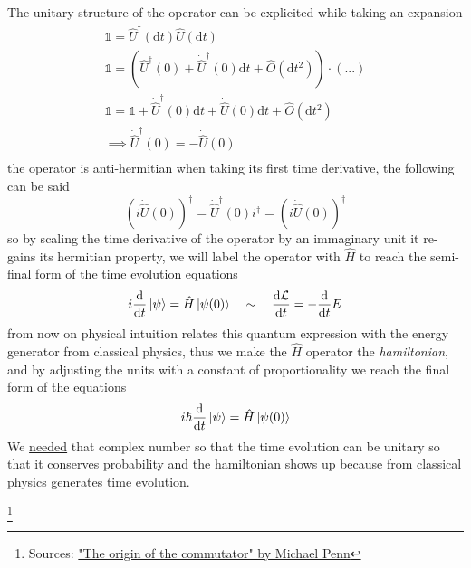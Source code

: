 \begin{multicols}{3}
  The unitary structure of the operator can be explicited while taking an expansion
  \begin{equation*}
    \begin{gathered}
      \mathds{1} = \hat{U}^\dagger(\text{d}t) \hat{U}(\text{d}t) \\
      \mathds{1} = \left(\hat{U}^\dagger(0) + \dot{\hat{U}}^\dagger(0)\text{d}t + \hat{O}(\text{d}t^2)\right) \cdot\left(...\right) \\
      \mathds{1} = \mathds{1} + \dot{\hat{U}}^\dagger(0)\text{d}t + \dot{\hat{U}}(0)\text{d}t + \hat{O}(\text{d}t^2) \\
      \implies \dot{\hat{U}}^\dagger(0) = -\dot{\hat{U}}(0) \\
    \end{gathered}
  \end{equation*}
  the operator is anti-hermitian when taking its first time derivative, the following can be said
  \begin{equation*}
    (i \dot{\hat{U}}(0))^\dagger = \dot{\hat{U}}^\dagger(0) i^\dagger = (i \dot{\hat{U}}(0))^\dagger
  \end{equation*}
  so by scaling the time derivative of the operator by an immaginary unit it re-gains its hermitian property,
  we will label the operator with $\hat{H}$ to reach the semi-final form of the time evolution equations
  \begin{equation*}
    i\dv{t}\ket\psi = \hat{H}\ket{\psi(0)} \quad \sim \quad \dv{\mathcal{L}}{t} = -\dv{t}E
  \end{equation*}
  from now on physical intuition relates this quantum expression with the energy generator from classical physics, thus we make
  the $\hat{H}$ operator the \textit{hamiltonian}, and by adjusting the units with a constant of proportionality we reach the final form of the equations
  \begin{equation*}
    i\hbar\dv{t}\ket\psi = \hat{H}\ket{\psi(0)}
  \end{equation*}
  We \underline{needed} that complex number so that the time evolution can be unitary so that it conserves probability and
  the hamiltonian shows up because from classical physics generates time evolution.
\end{multicols}




\footnote{Sources:
  \href{https://youtu.be/2_KVbtyufq8?si=KxYFdZ__YfD6ZzKm}
  {"The origin of the commutator" by Michael Penn}
}

